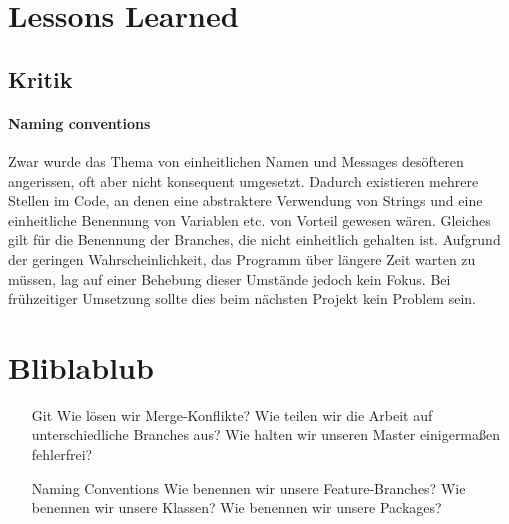 \section{Lessons Learned}

\subsection{Kritik}

\paragraph{Naming conventions} Zwar wurde das Thema von einheitlichen Namen und Messages desöfteren angerissen, oft aber nicht konsequent umgesetzt. Dadurch existieren mehrere Stellen im Code, an denen eine abstraktere Verwendung von Strings und eine einheitliche Benennung von Variablen etc. von Vorteil gewesen wären. Gleiches gilt für die Benennung der Branches, die nicht einheitlich gehalten ist. Aufgrund der geringen Wahrscheinlichkeit, das Programm über längere Zeit warten zu müssen, lag auf einer Behebung dieser Umstände jedoch kein Fokus. Bei frühzeitiger Umsetzung sollte dies beim nächsten Projekt kein Problem sein.

\section{Bliblablub}

	\begin{itemize}
		\item[Git] Wie lösen wir Merge-Konflikte? Wie teilen wir die Arbeit auf unterschiedliche Branches aus? Wie halten wir unseren Master einigermaßen fehlerfrei?
		\item[Naming Conventions] Wie benennen wir unsere Feature-Branches? Wie benennen wir unsere Klassen? Wie benennen wir unsere Packages?
	\end{itemize}